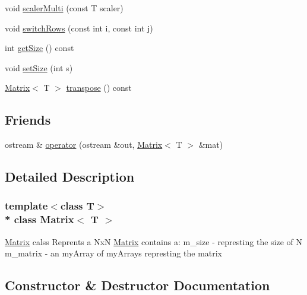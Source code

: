 \begin{DoxyCompactItemize}
\item 
void \hyperlink{classMatrix_aba8c673e5ca3bcc56a9bad1a1c0fed23}{scaler\+Multi} (const T scaler)
\item 
void \hyperlink{classMatrix_a23bb949d4b4256dd253808e35d73d4b9}{switch\+Rows} (const int i, const int j)
\item 
int \hyperlink{classMatrix_aa5d12d49bec4b4876f1a60c54a197ed7}{get\+Size} () const 
\item 
void \hyperlink{classMatrix_ad7a4ff9efa74bf23786446262bffd043}{set\+Size} (int s)
\item 
\hyperlink{classMatrix}{Matrix}$<$ T $>$ \hyperlink{classMatrix_afe686234b6fe54ab2ae7f500777ca560}{transpose} () const 
\end{DoxyCompactItemize}
\subsection*{Friends}
\begin{DoxyCompactItemize}
\item 
ostream \& \hyperlink{classMatrix_a7a26ce88f9d928002eba0af6847a0b44}{operator} (ostream \&out, \hyperlink{classMatrix}{Matrix}$<$ T $>$ \&mat)
\end{DoxyCompactItemize}


\subsection{Detailed Description}
\subsubsection*{template$<$class T$>$\\*
class Matrix$<$ T $>$}

\hyperlink{classMatrix}{Matrix} calss Reprents a NxN \hyperlink{classMatrix}{Matrix} contains a\+: m\+\_\+size -\/ represting the size of N m\+\_\+matrix -\/ an my\+Array of my\+Arrays represting the matrix 

\subsection{Constructor \& Destructor Documentation}
